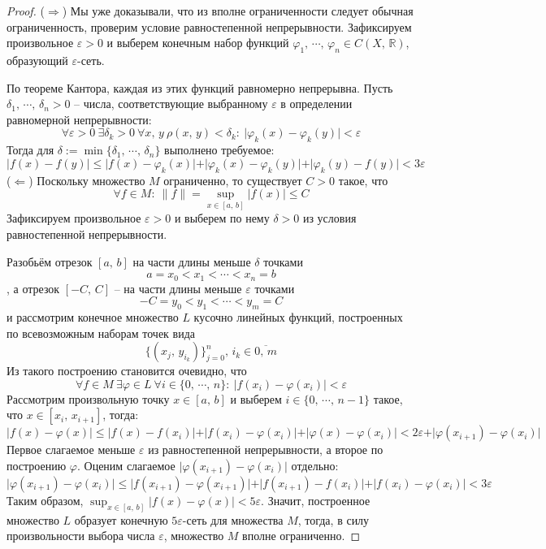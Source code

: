 \documentclass[a4paper,12pt]{article}
\renewcommand{\phi}{\ensuremath{\varphi}}
\renewcommand{\leq}{\ensuremath{\leqslant}}
\theoremstyle{plain}
\theoremstyle{definition}
\theoremstyle{remark}
\begin{document}
\begin{proof}
	($\Rightarrow$) Мы уже доказывали, что из вполне ограниченности следует обычная ограниченность, проверим условие равностепенной непрерывности. Зафиксируем произвольное $\varepsilon > 0$ и выберем конечным набор функций $\phi_1,\,\cdots,\,\phi_n \in C(X,\, \mathbb{R})$, образующий $\varepsilon$-сеть.

	По теореме Кантора, каждая из этих функций равномерно непрерывна. Пусть $\delta_1,\,\cdots,\,\delta_n > 0$ -- числа, соответствующие выбранному $\varepsilon$ в определении равномерной непрерывности:
	\[
		\forall \varepsilon > 0 \: \exists \delta_k > 0 \: \forall x,\,y \: \rho(x,\, y) < \delta_k :\: \vert\phi_k(x) -\phi_k(y)\vert < \varepsilon
	\]
	Тогда для $\delta := \min\{\delta_1,\,\cdots,\, \delta_n\}$ выполнено требуемое:
	\[
		\vert f(x) - f(y)\vert \leq \vert f(x) - \phi_k(x)\vert + \vert \phi_k(x) - \phi_k(y)\vert + \vert \phi_k(y) - f(y)\vert < 3\varepsilon
	\]
	($\Leftarrow$) Поскольку множество $M$ ограниченно, то существует $C > 0$ такое, что
	\[
		\forall f \in M :\: \|f\| = \sup_{x \in [a,\,b]} \vert f(x)\vert \leq C
	\]
	Зафиксируем произвольное $\varepsilon > 0$ и выберем по нему $\delta > 0$ из условия равностепенной непрерывности.

	Разобьём отрезок $[a,\,b]$ на части длины меньше $\delta$ точками
	\[
		a = x_0 < x_1 < \cdots < x_n = b
	\]
	, а отрезок $[-C,\, C]$ -- на части длины меньше $\varepsilon$ точками
	\[
		-C = y_0 < y_1 < \cdots < y_m = C
	\]
	и рассмотрим конечное множество $L$ кусочно линейных функций, построенных по всевозможным наборам точек вида
	\[
		\{(x_j,\, y_{i_k})\}_{j = 0}^n,\, i_k \in \overline{0,\,m}
	\]
	Из такого построению становится очевидно, что
	\[
		\forall f \in M \: \exists \phi \in L \: \forall i \in \{0,\,\cdots,\,n\} :\: \vert f(x_i) - \phi(x_i)\vert < \varepsilon
	\]
	Рассмотрим произвольную точку $x \in [a,\,b]$ и выберем $i \in \{0,\,\cdots,\, n-1\}$ такое, что $x \in [x_i,\, x_{i + 1}]$, тогда:
	\[
		\vert f(x) - \phi(x)\vert \leq \vert f(x) - f(x_i)\vert + \vert f(x_i) - \phi(x_i)\vert + \vert \phi(x) - \phi(x_i)\vert < 2\varepsilon + \vert \phi(x_{i + 1}) - \phi(x_i)\vert
	\]
	Первое слагаемое меньше $\varepsilon$ из равностепенной непрерывности, а второе по построению $\phi$. Оценим слагаемое $\vert \phi(x_{i + 1}) - \phi(x_i)\vert$ отдельно:
	\[
		\vert \phi(x_{i + 1}) - \phi(x_i)\vert \leq \vert f(x_{i + 1}) - \phi(x_{i + 1})\vert + \vert f(x_{i + 1}) - f(x_i)\vert + \vert f(x_i) - \phi(x_i)\vert < 3\varepsilon
	\]
	Таким образом, $\sup_{x \in [a,\,b]}\vert f(x) - \phi(x)\vert < 5\varepsilon$. Значит, построенное множество $L$ образует конечную $5\varepsilon$-сеть для множества $M$, тогда, в силу произвольности выбора числа $\varepsilon$, множество $M$ вполне ограниченно.
\end{proof}
\end{document}
